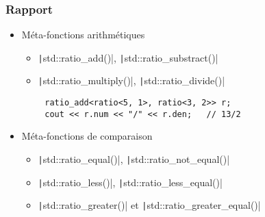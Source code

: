 \documentclass[C++.tex]{subfiles}
\begin{document}
\begin{frame}[fragile]
	\frametitle{Rapport}
	\begin{itemize}
		\item Méta-fonctions arithmétiques
		\begin{itemize}
			\item \texttt|std::ratio_add()|, \texttt|std::ratio_substract()|
			\item \texttt|std::ratio_multiply()|, \texttt|std::ratio_divide()|
		\end{itemize}

	\end{itemize}

	\begin{verbatim}
		ratio_add<ratio<5, 1>, ratio<3, 2>> r;
		cout << r.num << "/" << r.den;   // 13/2
	\end{verbatim}

	\begin{itemize}
		\item Méta-fonctions de comparaison
		\begin{itemize}
			\item \texttt|std::ratio_equal()|, \texttt|std::ratio_not_equal()|
			\item \texttt|std::ratio_less()|, \texttt|std::ratio_less_equal()|
			\item \texttt|std::ratio_greater()| et \texttt|std::ratio_greater_equal()|
		\end{itemize}
	\end{itemize}

\end{frame}
\end{document}
